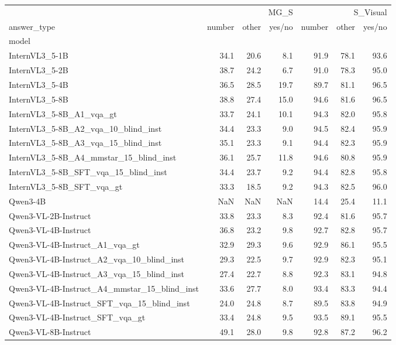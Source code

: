 \begin{tabular}{lrrrrrr}
\toprule
 & \multicolumn{3}{r}{MG_S} & \multicolumn{3}{r}{S_Visual} \\
answer_type & number & other & yes/no & number & other & yes/no \\
model &  &  &  &  &  &  \\
\midrule
InternVL3_5-1B & 34.1 & 20.6 & 8.1 & 91.9 & 78.1 & 93.6 \\
InternVL3_5-2B & 38.7 & 24.2 & 6.7 & 91.0 & 78.3 & 95.0 \\
InternVL3_5-4B & 36.5 & 28.5 & 19.7 & 89.7 & 81.1 & 96.5 \\
InternVL3_5-8B & 38.8 & 27.4 & 15.0 & 94.6 & 81.6 & 96.5 \\
InternVL3_5-8B_A1_vqa_gt & 33.7 & 24.1 & 10.1 & 94.3 & 82.0 & 95.8 \\
InternVL3_5-8B_A2_vqa_10_blind_inst & 34.4 & 23.3 & 9.0 & 94.5 & 82.4 & 95.9 \\
InternVL3_5-8B_A3_vqa_15_blind_inst & 35.1 & 23.3 & 9.1 & 94.4 & 82.3 & 95.9 \\
InternVL3_5-8B_A4_mmstar_15_blind_inst & 36.1 & 25.7 & 11.8 & 94.6 & 80.8 & 95.9 \\
InternVL3_5-8B_SFT_vqa_15_blind_inst & 34.4 & 23.7 & 9.2 & 94.4 & 82.8 & 95.8 \\
InternVL3_5-8B_SFT_vqa_gt & 33.3 & 18.5 & 9.2 & 94.3 & 82.5 & 96.0 \\
Qwen3-4B & NaN & NaN & NaN & 14.4 & 25.4 & 11.1 \\
Qwen3-VL-2B-Instruct & 33.8 & 23.3 & 8.3 & 92.4 & 81.6 & 95.7 \\
Qwen3-VL-4B-Instruct & 36.8 & 23.2 & 9.8 & 92.7 & 82.8 & 95.7 \\
Qwen3-VL-4B-Instruct_A1_vqa_gt & 32.9 & 29.3 & 9.6 & 92.9 & 86.1 & 95.5 \\
Qwen3-VL-4B-Instruct_A2_vqa_10_blind_inst & 29.3 & 22.5 & 9.7 & 92.9 & 82.3 & 95.1 \\
Qwen3-VL-4B-Instruct_A3_vqa_15_blind_inst & 27.4 & 22.7 & 8.8 & 92.3 & 83.1 & 94.8 \\
Qwen3-VL-4B-Instruct_A4_mmstar_15_blind_inst & 33.6 & 27.7 & 8.0 & 93.4 & 83.3 & 94.4 \\
Qwen3-VL-4B-Instruct_SFT_vqa_15_blind_inst & 24.0 & 24.8 & 8.7 & 89.5 & 83.8 & 94.9 \\
Qwen3-VL-4B-Instruct_SFT_vqa_gt & 33.4 & 24.8 & 9.5 & 93.5 & 89.1 & 95.5 \\
Qwen3-VL-8B-Instruct & 49.1 & 28.0 & 9.8 & 92.8 & 87.2 & 96.2 \\

\end{tabular}
